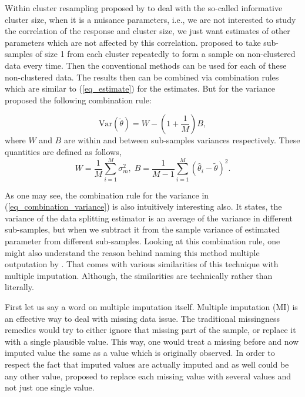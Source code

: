 \documentclass[11pt,a5paper,twoside]{book}
\begin{document}
Within cluster resampling proposed by \cite{hoffman2001} to deal with the so-called informative cluster size, when it is a nuisance parameters, i.e., we are not interested to study the correlation of the response and cluster size, we just want estimates of other parameters which are not affected by this correlation. \cite{hoffman2001} proposed to take sub-samples of size 1 from each cluster repeatedly to form a sample on non-clustered data every time. Then the conventional methods can be used for each of these non-clustered data. The results then can be combined via combination rules which are similar to (\ref{eq_estimate}) for the estimates. But for the variance \cite{hoffman2001} proposed the following combination rule:

\begin{equation}
\label{eq_combination_variance}
\mathrm{Var}(\widetilde{\theta}) = W - \left(1 + \frac{1}{M}\right) B,
\end{equation}
where $W$ and $B$ are within and between sub-samples variances respectively. These quantities are defined as follows,
\begin{equation}
\label{eq_W_B_Var}
W = \frac{1}{M} \sum_{i=1}^M \sigma^2_m,\; B = \frac{1}{M-1} \sum_{i=1}^M \left(\widehat{\theta}_i - \widetilde{\theta} \right)^2.
\end{equation}

As one may see, the combination rule for the variance in (\ref{eq_combination_variance}) is also intuitively interesting also. It states, the variance of the data splitting estimator is an average of the variance in different sub-samples, but when we subtract it from the sample variance of estimated parameter from different sub-samples. Looking at this combination rule, one might also understand the reason behind naming this method multiple outputation by \cite{follmann2003}. That comes with various similarities of this technique with multiple imputation. Although, the similarities are technically rather than literally. 

First let us say a word on multiple imputation itself. Multiple imputation (MI) is an effective way to deal with missing data issue. The traditional missingness remedies would try to either ignore that missing part of the sample, or replace it with a single plausible value. This way, one would treat a missing before and now imputed value the same as a value which is originally observed. In order to respect the fact that imputed values are actually imputed and as well could be any other value, \cite{rubin1978} proposed to replace each missing value with several values and not just one single value. 
\end{document}
